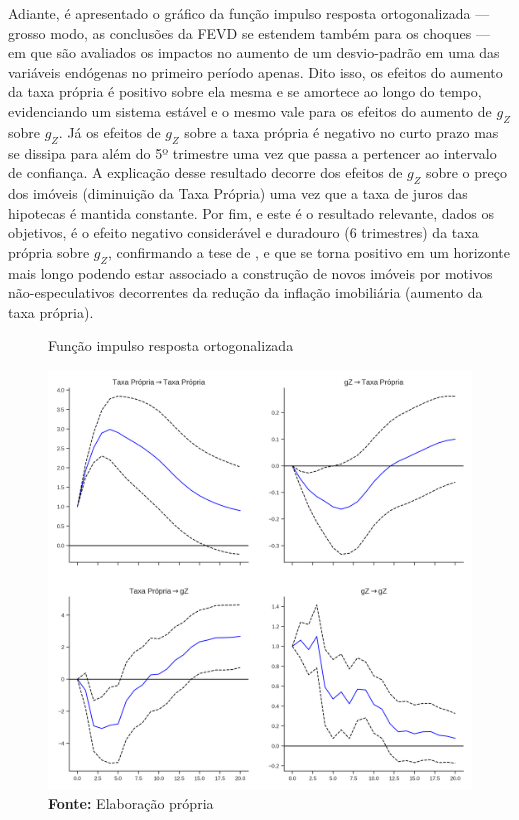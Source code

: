Adiante, é apresentado o gráfico da função impulso resposta ortogonalizada --- grosso modo, as conclusões da FEVD se estendem também para os choques --- em que são avaliados os impactos no aumento de um desvio-padrão em uma das variáveis endógenas no primeiro período apenas. 
Dito isso, os efeitos do aumento da taxa própria é positivo sobre ela mesma e se amortece ao longo do tempo, evidenciando um sistema estável e o mesmo vale para os efeitos do aumento de $g_Z$ sobre $g_Z$. Já os efeitos de $g_Z$ sobre a taxa própria é negativo no curto prazo mas se dissipa para além do 5º trimestre uma vez que passa a pertencer ao intervalo de confiança. A explicação desse resultado decorre dos efeitos de $g_Z$ sobre o preço dos imóveis (diminuição da Taxa Própria) uma vez que a taxa de juros das hipotecas é mantida constante. Por fim, e este é o resultado relevante, dados os objetivos, é o efeito negativo considerável e duradouro (6 trimestres) da taxa própria sobre $g_Z$, confirmando a tese de \textcite{teixeira_crescimento_2015}, e que se torna positivo em um horizonte mais longo podendo estar associado a construção de novos imóveis por motivos não-especulativos decorrentes da redução da inflação imobiliária (aumento da taxa própria).


\begin{figure}[htb]
	\centering
	\caption{Função impulso resposta ortogonalizada}
	\label{fevd}
	\includegraphics[width=\textwidth]{Fatos_Estilizados/Figs/Impulso_VECM.png}
	\caption*{\textbf{Fonte:} Elaboração própria}
\end{figure}

